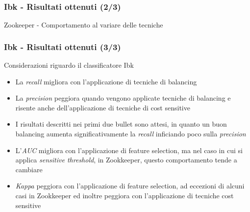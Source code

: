 \documentclass[
	usepdftitle=false,
	xcolor={table, dvipsnames},
	hyperref={
		pdftitle={Machine Learning per Software Engineering},
    	pdfauthor={Alessando Chillotti}
    }
]{beamer}
\begin{document}
\begin{frame}
\frametitle{Ibk - Risultati ottenuti (2/3)}
\begin{block}{Zookeeper - Comportamento al variare delle tecniche}
\begin{figure}[ht!]
\end{figure}
\end{block}
\end{frame}

\begin{frame}
\frametitle{Ibk - Risultati ottenuti (3/3)}
\begin{block}{Considerazioni riguardo il classificatore Ibk}
\begin{itemize}
\item La \textit{recall} migliora con l'applicazione di tecniche di balancing
\item La \textit{precision} peggiora quando vengono applicate tecniche di balancing e risente anche dell'applicazione di tecniche di cost sensitive
\item I risultati descritti nei primi due bullet sono attesi, in quanto un buon balancing aumenta significativamente la \textit{recall} inficiando poco sulla \textit{precision}
\item L'\textit{AUC} migliora con l'applicazione di feature selection, ma nel caso in cui si applica \textit{sensitive threshold}, in Zookkeeper, questo comportamento tende a cambiare
\item \textit{Kappa} peggiora con l'applicazione di feature selection, ad eccezioni di alcuni casi in Zookkeeper ed inoltre peggiora con l'applicazione di tecniche cost sensitive
\end{itemize}
\end{block}
\end{frame}
\end{document}
